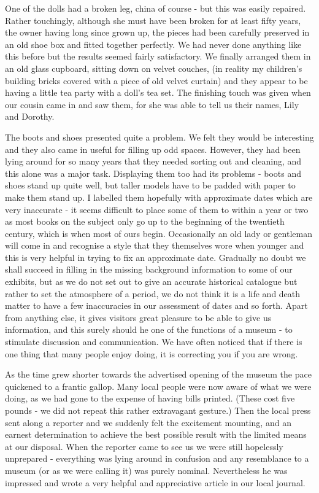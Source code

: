 One of the dolls had a broken leg, china of course - but this was easily repaired. Rather touchingly, although she must have been broken for at least fifty years, the owner having long since grown up, the pieces had been carefully preserved in an old shoe box and fitted together perfectly. We had never done anything like this before but the results seemed fairly satisfactory. We finally arranged them in an old glass cupboard, sitting down on velvet couches, (in reality my children's building bricks covered with a piece of old velvet curtain) and they appear to be having a little tea party with a doll's tea set. The finishing touch was given when our cousin came in and saw them, for she was able to tell us their names, Lily and Dorothy. 

The boots and shoes presented quite a problem. We felt they would be interesting and they also came in useful for filling up odd spaces. However, they had been lying around for so many years that they needed sorting out and cleaning, and this alone was a major task. Displaying them too had its problems - boots and shoes stand up quite well, but taller models have to be padded with paper to make them stand up. I labelled them hopefully with approximate dates which are very inaccurate - it seems difficult to place some of them to within a year or two as most books on the subject only go up to the beginning of the twentieth century, which is when most of ours begin. Occasionally an old lady or gentleman will come in and recognise a style that they themselves wore when younger and this is very helpful in trying to fix an approximate date. Gradually no doubt we shall succeed in filling in the missing background information to some of our exhibits, but as we do not set out to give an accurate historical catalogue but rather to set the atmosphere of a period, we do not think it is a life and death matter to have a few inaccuracies in our assessment of dates and so forth. Apart from anything else, it gives visitors great pleasure to be able to give us information, and this surely should he one of the functions of a museum - to stimulate discussion and communication. We have often noticed that if there is one thing that many people enjoy doing, it is correcting you if you are wrong.

As the time grew shorter towards the advertised opening of the museum the pace quickened to a frantic gallop. Many local people were now aware of what we were doing, as we had gone to the expense of having bills printed. (These cost five pounds - we did not repeat this rather extravagant gesture.) Then the local press sent along a reporter and we suddenly felt the excitement mounting, and an earnest determination to achieve the best possible result with the limited means at our disposal. When the reporter came to see us we were still hopelessly unprepared - everything was lying around in confusion and any resemblance to a museum (or  as we were calling it) was purely nominal. Nevertheless he was impressed and wrote a very helpful and appreciative article in our local journal.

